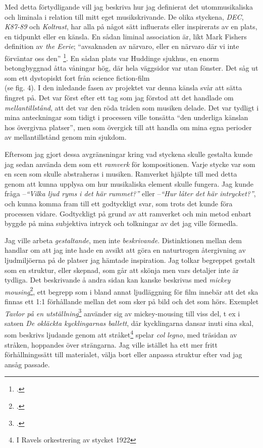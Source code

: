 \documentclass{article}
\begin{document}
Med detta förtydligande vill jag beskriva hur jag definierat det utommusikaliska och liminala i
relation till mitt eget musikskrivande. De olika styckena, \emph{DEC}, \emph{K87-89} och \emph{Koltrast}, har
alla på något sätt influerats eller inspirerats av en plats, en tidpunkt eller en känsla. 
En sådan liminal association är, likt Mark Fishers definition av \emph{the Eerie};
``avsaknaden av närvaro, eller en närvaro där vi inte förväntar oss den''
\footcite[Egen översättning, s. 12]{Fisher}.
En sådan plats var Huddinge sjukhus, en enorm betongbyggnad åtta våningar hög, där hela väggsidor var utan
fönster. Det såg ut som ett dystopiskt fort från science fiction-film \\(se fig. 4). I den inledande fasen av
projektet var denna känsla svår att sätta fingret på. Det var först efter ett tag som jag förstod att det
handlade om \emph{mellantillstånd}, att det var den röda tråden som musiken delade. Det var tydligt i mina
anteckningar som tidigt i processen ville tonsätta ``den underliga känslan hos övergivna platser'', men som
övergick till att handla om mina egna perioder av mellantillstånd genom min sjukdom.

Eftersom jag gjort dessa avgränsningar kring vad styckena skulle gestalta kunde jag sedan använda dem som ett
\emph{ramverk} för kompositionen. Varje stycke var som en scen som skulle abstraheras i musiken. Ramverket
hjälpte till med detta genom att kunna upplysa om hur musikaliska element skulle fungera. Jag kunde fråga 
--\emph{``Vilka ljud ryms i det här rummet?''} eller --\emph{``Hur låter det här intrycket?''}, och kunna
komma fram till ett godtyckligt svar, som trots det kunde föra processen vidare. Godtyckligt på grund av att
ramverket och min metod enbart byggde på mina subjektiva intryck och tolkningar av det jag ville förmedla.


Jag ville arbeta \emph{gestaltande}, men inte \emph{beskrivande}. Distinktionen mellan dem handlar om att jag
inte hade en avsikt att göra en naturtrogen återgivning av ljudmiljöerna på de platser jag hämtade
inspiration. Jag tolkar begreppet gestalt som en struktur, eller skepnad, som går att skönja men vars detaljer
inte är tydliga. Det beskrivande å andra sidan kan kanske beskrivas med \emph{mickey
mousing}\footcite{mickeymouse}, ett begrepp som i bland annat ljudläggning för film innebär att det ska finnas
ett 1:1 förhållande mellan det som sker på bild och det som hörs. Exemplet \emph{Tavlor på en
utställning}\footcite{Tavlor} använder sig av mickey-mousing till viss del, t ex i satsen \emph{De okläckta
kycklingarnas ballett}, där kycklingarna dansar inuti sina skal, som beskrivs ljudande genom att
stråket\footnote{I Ravels orkestrering av stycket 1922} spelar \emph{col legno}, med träsidan av stråken,
hoppandes över strängarna. Jag ville istället ha ett mer fritt förhållningssätt till materialet, välja bort
eller anpassa struktur efter vad jag ansåg passade.
\end{document}
